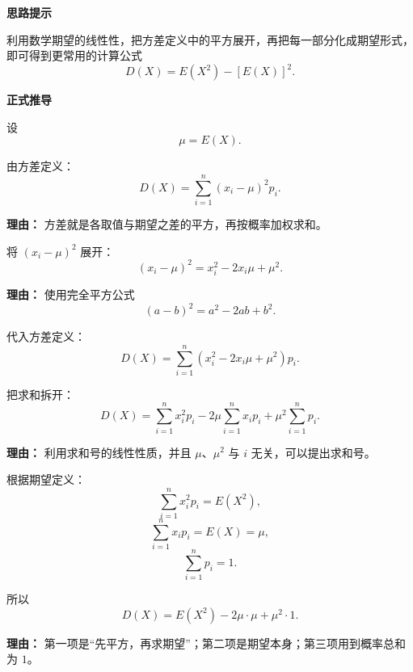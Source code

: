 \begin{proofbox}
	\textbf{\textcolor{CProof}{思路提示}}

	利用数学期望的线性性，把方差定义中的平方展开，再把每一部分化成期望形式，
	即可得到更常用的计算公式
	\[
		D(X)=E(X^2)-[E(X)]^2.
	\]

	\medskip

	\textbf{\textcolor{CProof}{正式推导}}

	设
	\[
		\mu=E(X).
	\]

	\begin{description}[style=nextline, leftmargin=2.8em, labelsep=0.5em, itemsep=0.55em]
		\item[\textbf{步骤一（写出定义式）：}]
		      由方差定义：
		      \[
			      D(X)=\sum_{i=1}^{n}(x_i-\mu)^2p_i.
		      \]

		      \par\textbf{理由：}
		      方差就是各取值与期望之差的平方，再按概率加权求和。

		\item[\textbf{步骤二（展开平方）：}]
		      将 $(x_i-\mu)^2$ 展开：
		      \[
			      (x_i-\mu)^2=x_i^2-2x_i\mu+\mu^2.
		      \]

		      \par\textbf{理由：}
		      使用完全平方公式
		      \[
			      (a-b)^2=a^2-2ab+b^2.
		      \]

		\item[\textbf{步骤三（代入并拆项）：}]
		      代入方差定义：
		      \[
			      D(X)=\sum_{i=1}^{n}(x_i^2-2x_i\mu+\mu^2)p_i.
		      \]

		      把求和拆开：
		      \[
			      D(X)=\sum_{i=1}^{n}x_i^2p_i
			      -2\mu\sum_{i=1}^{n}x_ip_i
			      +\mu^2\sum_{i=1}^{n}p_i.
		      \]

		      \par\textbf{理由：}
		      利用求和号的线性性质，并且 $\mu$、$\mu^2$ 与 $i$ 无关，可以提出求和号。

		\item[\textbf{步骤四（化为期望形式）：}]
		      根据期望定义：
		      \[
			      \sum_{i=1}^{n}x_i^2p_i=E(X^2),
		      \]
		      \[
			      \sum_{i=1}^{n}x_ip_i=E(X)=\mu,
		      \]
		      \[
			      \sum_{i=1}^{n}p_i=1.
		      \]

		      所以
		      \[
			      D(X)=E(X^2)-2\mu\cdot\mu+\mu^2\cdot1.
		      \]

		      \par\textbf{理由：}
		      第一项是“先平方，再求期望”；第二项是期望本身；第三项用到概率总和为 $1$。


\end{description}
\end{proofbox}
